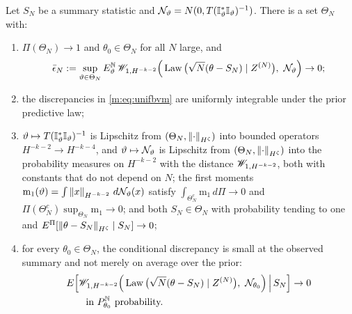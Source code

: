 \begin{assumption}\label{m:ass:U}
Let $S_N$ be a summary statistic and $\mathcal{N}_\vartheta=N(0,T(\mathbb{I}^*_\vartheta\mathbb{I}_\vartheta)^{-1})$. There is a set $\Theta_N$ with:
\begin{enumerate}[label=(U\arabic*),nosep]
\item $\Pi(\Theta_N)\to1$ and $\theta_0\in\Theta_N$ for all $N$ large, and
\begin{equation}\label{m:eq:unifbvm}
\bar\epsilon_N:=\sup_{\vartheta\in\Theta_N}E^{\mathbb{N}}_\vartheta\,\mathscr{W}_{1,H^{-k-2}}\Big(\operatorname{Law}\big(\sqrt N(\theta-S_N)\mid Z^{(N)}\big),\ \mathcal{N}_\vartheta\Big)\to0 ;
\end{equation}
\item the discrepancies in \eqref{m:eq:unifbvm} are uniformly integrable under the prior predictive law;
\item $\vartheta\mapsto T(\mathbb{I}^*_\vartheta\mathbb{I}_\vartheta)^{-1}$ is Lipschitz from $(\Theta_N,\left\|\cdot\right\|_{H^\zeta})$ into bounded operators $H^{-k-2}\to H^{-k-4}$, and $\vartheta\mapsto\mathcal{N}_\vartheta$ is Lipschitz from $(\Theta_N,\left\|\cdot\right\|_{H^\zeta})$ into the probability measures on $H^{-k-2}$ with the distance $\mathscr{W}_{1,H^{-k-2}}$, both with constants that do not depend on $N$; the first moments $\mathrm m_1(\vartheta)=\int\left\|x\right\|_{H^{-k-2}}\,d\mathcal{N}_\vartheta(x)$ satisfy $\int_{\Theta_N^c}\mathrm m_1\,d\Pi\to0$ and $\Pi(\Theta_N^c)\sup_{\Theta_N}\mathrm m_1\to0$; and both $S_N\in\Theta_N$ with probability tending to one and $E^\Pi[\left\|\theta-S_N\right\|_{H^\zeta}\mid S_N]\to0$;
\item for every $\theta_0\in\Theta_N$, the conditional discrepancy is small at the observed summary and not merely on average over the prior:
\begin{equation}\label{m:eq:unifcond}
\begin{aligned}
&E\Big[\mathscr{W}_{1,H^{-k-2}}\Big(\operatorname{Law}\big(\sqrt N(\theta-S_N)\mid Z^{(N)}\big),\ \mathcal{N}_{\theta_0}\Big)\,\Big|\,S_N\Big]\to0\\
&\qquad\text{in }P^{\mathbb{N}}_{\theta_0}\text{ probability.}
\end{aligned}
\end{equation}
\end{enumerate}
\end{assumption}

